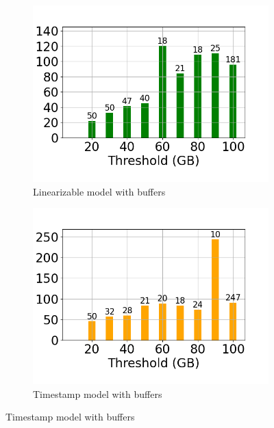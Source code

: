 \begin{figure}
	\centering
	\begin{subfigure}[c]{0.48\textwidth}
		\includegraphics[width=1\textwidth]   {figures/Experiments/Dynamic/Progress/2/average_query_time_per_batch_version_999777015_10485760_10_delay[2].png}
		\caption{Linearizable model with buffers}
		\label{fig:progress-queries-2-logical}
	\end{subfigure}
	\begin{subfigure}[c]{0.48\textwidth}
		\includegraphics[width=1\textwidth]   {figures/Experiments/Dynamic/Progress/2/average_query_time_per_batch_version_999777018_10485760_10_delay[2].png}
		\caption{Timestamp model with buffers}
		\label{fig:progress-queries-2-system}

\end{subfigure}
\end{figure}
